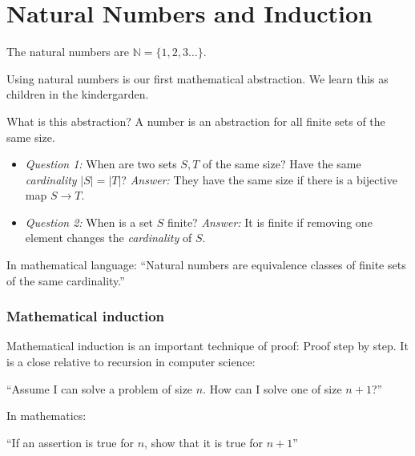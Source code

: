 
\section{Natural Numbers and Induction}
The natural numbers are $\mathbb{N} = \{1,2,3 \ldots \}$.

Using natural numbers is our first mathematical abstraction. We learn this as children in the kindergarden. 

What is this abstraction? A number is an abstraction for all finite sets of the same size.

\begin{itemize}
 \item \emph{Question 1:} When are two sets $S,T$ of the same size?  Have the same \emph{cardinality} $|S|=|T|$?
 \emph{Answer:} They have the same size
 if there is a bijective map $S\to T$.
 \item \emph{Question 2:} When is a set $S$ finite? \emph{Answer:}
 It is finite if removing one element changes the \emph{cardinality} of $S$. 
 \white{3cm}{}
\end{itemize}

In mathematical language: ``Natural numbers are equivalence classes of finite sets of the same cardinality.'' 

\subsubsection{Mathematical induction}

Mathematical induction is an important technique of proof: Proof step by step. It is a close relative to 
recursion in computer science:

``Assume I can solve a problem of size $n$. How can I solve one of size $n+1$?''

In mathematics:

``If an assertion is true for $n$, show that it is true for $n+1$''


